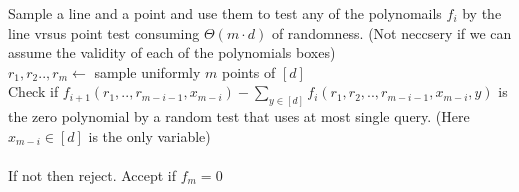 \documentclass{article}
\begin{document}
\begin{algorithm}[H]
  Sample a line and a point and use them to test any of the polynomails $f_{i}$ by the line vrsus point test consuming $\Theta\left( m\cdot d \right)$ of randomness.  (Not neccsery if we can assume the validity of each of the polynomials boxes) \\  
    $r_{1}, r_{2} .., r_{m} \leftarrow$ sample uniformly  $m$ points of $[d]$ \\
     {
      Check if $f_{i+1}\left( r_{1} , .., r_{m-i-1}, x_{m-i} \right) - \sum_{y \in [d]}{f_{i} \left( r_{1}, r_{2}, .., r_{m-i-1},x_{m-i}, y \right)} $ is the zero polynomial by a random test that uses at most single query. (Here $x_{m-i} \in [d]$ is the only variable)  \\
      \ \\
      If not then reject.  
    }
    Accept if $f_{m} = 0 $  
\end{algorithm}
\end{document}
